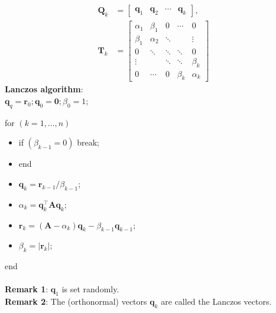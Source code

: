 \documentclass[11pt]{book}
\begin{document}
$$
\begin{aligned}
\mathbf{Q}_{k} & =\left[\begin{array}{llll}
\mathbf{q}_{1} & \mathbf{q}_{2} & \cdots & \mathbf{q}_{k}
\end{array}\right], \\
\mathbf{T}_{k} & =\left[\begin{array}{ccccc}
\alpha_{1} & \beta_{1} & 0 & \cdots & 0 \\
\beta_{1} & \alpha_{2} & \ddots & & \vdots \\
0 & \ddots & \ddots & \ddots & 0 \\
\vdots & & \ddots & \ddots & \beta_{k} \\
0 & \cdots & 0 & \beta_{k} & \alpha_{k}
\end{array}\right]
\end{aligned}
$$
\textbf{Lanczos algorithm}: \\
$\mathbf{q}_{q}=\mathbf{r}_{0} ; \mathbf{q}_{0}=\mathbf{0} ; \beta_{0}=1 ;$

for $(k=1, \ldots, n)$

\begin{itemize}
  \item if $\left(\beta_{k-1}=0\right)$
        break;
  \item end

  \item $\mathbf{q}_{k}=\mathbf{r}_{k-1} / \beta_{k-1}$;

  \item $\alpha_{k}=\mathbf{q}_{k}^{\top} \mathbf{A} \mathbf{q}_{k}$;

  \item $\mathbf{r}_{k}=\left(\mathbf{A}-\alpha_{k}\right) \mathbf{q}_{k}-\beta_{k-1} \mathbf{q}_{k-1}$;

  \item $\beta_{k}=\left|\mathbf{r}_{k}\right|$;

\end{itemize}
end\\ \\ 
\textbf{Remark 1}: $\mathbf{q}_{1}$ is set randomly.\\
\textbf{Remark 2}: The (orthonormal) vectors $\mathbf{q}_{k}$ are called the Lanczos vectors.
\end{document}
